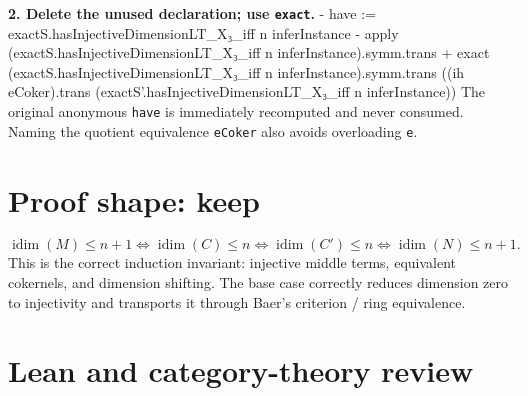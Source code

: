 \documentclass[10pt]{article}
\newenvironment{lean}{\Verbatim[fontsize=\scriptsize,frame=single,framesep=1.5mm,rulecolor=\color{navy},formatcom=\leanfont]}{\endVerbatim}
\newcommand{\idim}{\operatorname{idim}}
\begin{document}
\textbf{2. Delete the unused declaration; use \texttt{exact}.}
\begin{lean}
- have := exactS.hasInjectiveDimensionLT_X₃_iff n inferInstance
- apply (exactS.hasInjectiveDimensionLT_X₃_iff n inferInstance).symm.trans
+ exact (exactS.hasInjectiveDimensionLT_X₃_iff n inferInstance).symm.trans
    ((ih eCoker).trans
      (exactS'.hasInjectiveDimensionLT_X₃_iff n inferInstance))
\end{lean}
The original anonymous \texttt{have} is immediately recomputed and never consumed.  Naming the
quotient equivalence \texttt{eCoker} also avoids overloading \texttt{e}.

\section*{Proof shape: keep}
\begin{center}
\end{center}
\[
\idim(M)\le n+1
\iff \idim(C)\le n
\iff \idim(C')\le n
\iff \idim(N)\le n+1.
\]
This is the correct induction invariant: injective middle terms, equivalent cokernels, and dimension
shifting.  The base case correctly reduces dimension zero to injectivity and transports it through
Baer's criterion / ring equivalence.

\newpage
\section*{Lean and category-theory review}
\end{document}
